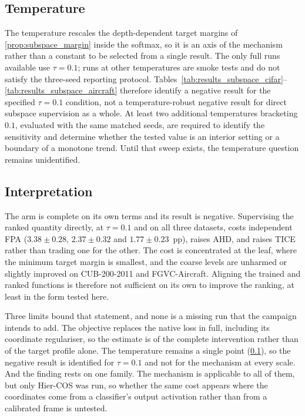 \subsection{Temperature}
\label{ssec:results_subspace_tau}

The temperature rescales the depth-dependent target margins of
\cref{prop:subspace_margin} inside the softmax, so it is an axis of the mechanism
rather than a constant to be selected from a single result. The only full runs available
use $\tau=0.1$; runs at other temperatures are smoke tests and do not satisfy
the three-seed reporting protocol.
Tables~\ref{tab:results_subspace_cifar}--\ref{tab:results_subspace_aircraft}
therefore identify a negative result for the specified $\tau=0.1$ condition,
not a temperature-robust negative result for direct subspace supervision as a
whole. At least two additional temperatures bracketing $0.1$, evaluated with
the same matched seeds, are required to identify the sensitivity and determine
whether the tested value is an interior setting or a boundary of a monotone
trend. Until that sweep exists, the temperature question remains unidentified.

\subsection{Interpretation}
\label{ssec:results_subspace_summary}

The arm is complete on its own terms and its result is negative. Supervising the
ranked quantity directly, at $\tau=0.1$ and on all three datasets, costs
independent FPA ($3.38\pm0.28$, $2.37\pm0.32$ and $1.77\pm0.23$~pp), raises AHD,
and raises TICE rather than trading one for the other. The cost is concentrated
at the leaf, where the minimum target margin is smallest, and the coarse levels
are unharmed or slightly improved on CUB-200-2011 and FGVC-Aircraft. Aligning the
trained and ranked functions is therefore not sufficient on its own to improve
the ranking, at least in the form tested here.

Three limits bound that statement, and none is a missing run that the campaign
intends to add. The objective replaces the native loss in full, including its
coordinate regulariser, so the estimate is of the complete intervention rather
than of the target profile alone. The temperature remains a single point
(\cref{ssec:results_subspace_tau}), so the negative result is identified for
$\tau=0.1$ and not for the mechanism at every scale. And the finding rests on one
family. The mechanism is applicable to all of them, but only Hier-COS was run, so
whether the same cost appears where the coordinates come from a classifier's
output activation rather than from a calibrated frame is untested.

